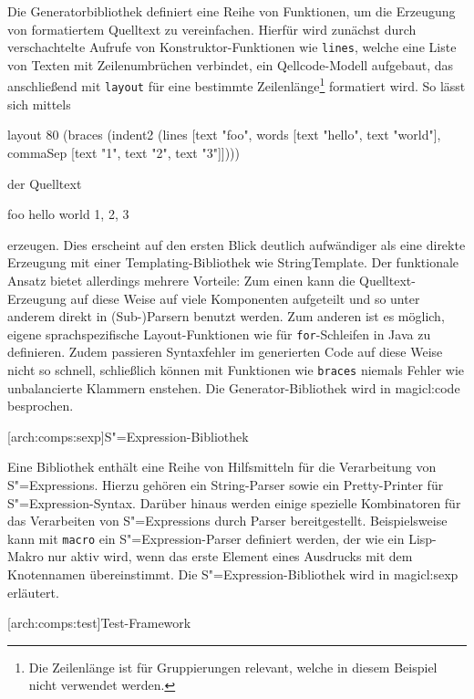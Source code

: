 \documentclass[12pt, a4paper, bibgerm]{scrbook}
\newcommand\icode[1]{\lstinline?#1?}
\newcommand\lsubsection{}
\newcommand\sref{}
\newcommand{\sexp}{S"=Expression}
\newcommand{\sexps}{S"=Expressions}
\begin{document}
Die Generatorbibliothek definiert eine Reihe von Funktionen, um die
Erzeugung von formatiertem Quelltext zu vereinfachen. Hierfür wird
zunächst durch verschachtelte Aufrufe von Konstruktor-Funktionen wie
\icode{lines}, welche eine Liste von Texten mit Zeilenumbrüchen
verbindet, ein Qellcode-Modell aufgebaut, das anschließend mit
\icode{layout} für eine bestimmte Zeilenlänge\footnote{Die Zeilenlänge
  ist für Gruppierungen relevant, welche in diesem Beispiel nicht
  verwendet werden.} formatiert wird. So lässt sich mittels
\begin{code}
layout 80 (braces 
           (indent2 
            (lines [text "foo",
                    words [text "hello", text "world"],
                    commaSep [text "1", text "2", text "3"]])))
\end{code}
der Quelltext
\begin{code}
{foo
  hello world
  1, 2, 3}
\end{code}
erzeugen. Dies erscheint auf den ersten Blick deutlich aufwändiger als
eine direkte Erzeugung mit einer Templating-Bibliothek wie
StringTemplate. Der funktionale Ansatz bietet allerdings mehrere
Vorteile: Zum einen kann die Quelltext-Erzeugung auf diese Weise auf
viele Komponenten aufgeteilt und so unter anderem direkt in
(Sub-)Parsern benutzt werden. Zum anderen ist es möglich, eigene
sprachspezifische Layout-Funktionen wie für \icode{for}-Schleifen in
Java zu definieren. Zudem passieren Syntaxfehler im generierten Code auf
diese Weise nicht so schnell, schließlich können mit Funktionen wie
\icode{braces} niemals Fehler wie unbalancierte Klammern enstehen. Die
Generator-Bibliothek wird in \sref{magicl:code} besprochen.

\lsubsection[arch:comps:sexp]{\sexp{}-Bibliothek}

Eine Bibliothek enthält eine Reihe von Hilfsmitteln für die Verarbeitung
von \sexps{}. Hierzu gehören ein String-Parser sowie ein Pretty-Printer
für \sexp{}-Syntax. Darüber hinaus werden einige spezielle Kombinatoren
für das Verarbeiten von \sexps{} durch Parser
bereitgestellt. Beispielsweise kann mit \icode{macro} ein \sexp{}-Parser
definiert werden, der wie ein Lisp-Makro nur aktiv wird, wenn das erste
Element eines Ausdrucks mit dem Knotennamen übereinstimmt. Die
\sexp{}-Bibliothek wird in \sref{magicl:sexp} erläutert.

\lsubsection[arch:comps:test]{Test-Framework}
\end{document}
